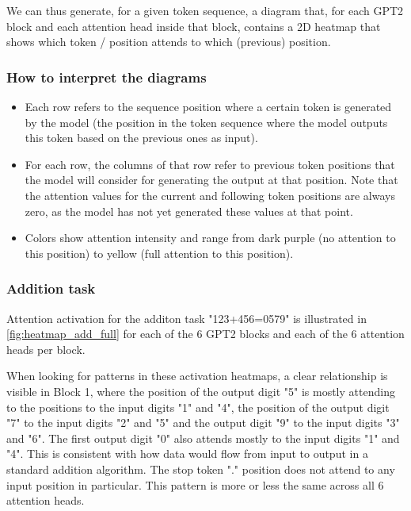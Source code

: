 We can thus generate, for a given token sequence,
a diagram that, for each GPT2 block and each attention head inside that block, contains a 2D heatmap that shows which token / position attends to which (previous) position.

\subsubsection{How to interpret the diagrams}

\begin{itemize}
    \item Each row refers to the sequence position where a certain token is generated by the model (the position in the token sequence where the model outputs this token based on the previous ones as input).
    
    \item For each row, the columns of that row refer to previous token positions that the model will consider for generating the output at that position. Note that the attention values for the current and following token positions are always zero, as the model has not yet generated these values at that point.
    
    \item Colors show attention intensity and range from dark purple (no attention to this position) to yellow (full attention to this position).
\end{itemize}


\subsubsection{Addition task}


Attention activation for the additon task "123+456=0579" is illustrated in \cref{fig:heatmap_add_full} for each of the 6 GPT2 blocks and each of the 6 attention heads per block.

When looking for patterns in these activation heatmaps, a clear relationship is visible in Block 1, where the position of the output digit "5" is mostly attending to the positions to the input digits "1" and "4", the position of the output digit "7" to the input digits "2" and "5" and the output digit "9" to the input digits "3" and "6". The first output digit "0" also attends mostly to the input digits "1" and "4". This is consistent with how data would flow from input to output in a standard addition algorithm. The stop token "." position does not attend to any input position in particular.
This pattern is more or less the same across all 6 attention heads.

